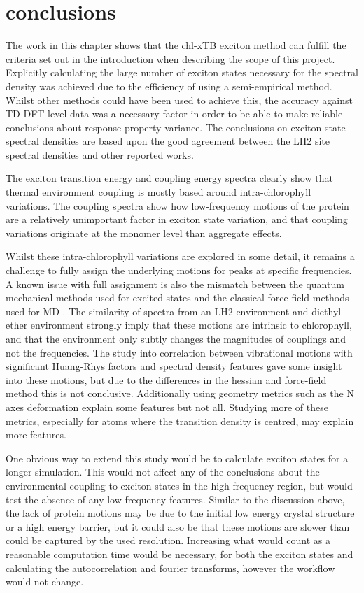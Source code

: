 \section{conclusions}
\label{sec:specdens_concs}

The work in this chapter shows that the chl-xTB exciton method can fulfill the criteria
set out in the introduction when describing the scope of this project. Explicitly 
calculating the large number of exciton states necessary for the spectral density 
was achieved  due to the efficiency of using a semi-empirical method. Whilst other 
methods could have been used to achieve this, the accuracy against TD-DFT level 
data was a necessary factor in order to be able to make reliable conclusions about 
response property variance. The conclusions on exciton state spectral densities 
are based upon the good agreement between the LH2 site spectral densities and other 
reported works.

The exciton transition energy and coupling energy spectra clearly show that thermal
environment coupling is mostly based around intra-chlorophyll variations. The coupling
spectra show how low-frequency motions of the protein are a relatively unimportant 
factor in exciton state variation, and that coupling variations originate at the
monomer level than aggregate effects.

Whilst these intra-chlorophyll variations are explored in some detail, it remains
a challenge to fully assign the underlying motions for peaks at specific frequencies.
A known issue with full assignment is also the mismatch between the quantum mechanical
methods used for excited states and the classical force-field methods used for MD \cite{Zuehlsdorff2022}.
The similarity of spectra from an LH2 environment and diethyl-ether environment 
strongly imply that these motions are intrinsic to chlorophyll, and that the environment
only subtly changes the magnitudes of couplings and not the frequencies. The study
into correlation between vibrational motions with significant Huang-Rhys factors 
and spectral density features gave some insight into these motions, but due to the
differences in the hessian and force-field method this is not conclusive. Additionally 
using geometry metrics such as the N axes deformation explain some features but not
all. Studying more of these metrics, especially for atoms where the transition density
is centred, may explain more features.

One obvious way to extend this study would be to calculate exciton states for a 
longer simulation. This would not affect any of the conclusions about the environmental
coupling to exciton states in the high frequency region, but would test the absence
of any low frequency features. Similar to the discussion above, the lack of protein 
motions may be due to the initial low energy crystal structure or a high energy 
barrier, but it could also be that these motions are slower than could be captured 
by the used resolution. Increasing what would count as a reasonable computation 
time would be necessary, for both the exciton states and calculating the autocorrelation 
and fourier transforms, however the workflow would not change.

